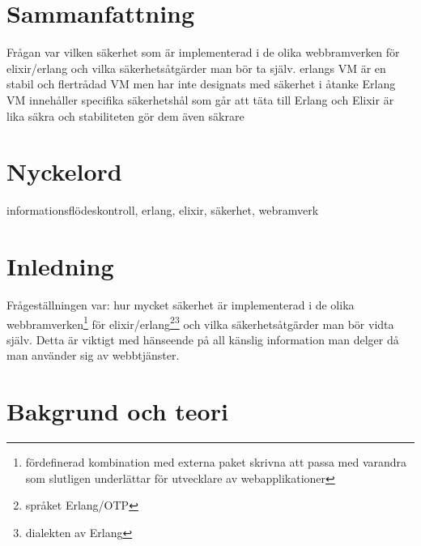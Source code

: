 \documentclass[12pt]{article}
\begin{document}
\maketitle

	 	 	 	 	
	
\section*{Sammanfattning}
Frågan var vilken säkerhet som är implementerad i de olika webbramverken för elixir/erlang och vilka säkerhetsåtgärder man bör ta själv.	
erlangs VM är en stabil och flertrådad VM men har inte designats med säkerhet i åtanke 
Erlang VM innehåller specifika säkerhetshål som går att täta till
Erlang och Elixir är lika säkra och stabiliteten gör dem även säkrare
	
\section*{Nyckelord}
informationsflödeskontroll, erlang, elixir, säkerhet, webramverk
	\section{Inledning}

Frågeställningen var: hur mycket säkerhet är implementerad i de olika webbramverken\footnote{fördefinerad kombination med externa paket skrivna att passa med varandra som slutligen underlättar för utvecklare av webapplikationer} för elixir/erlang\footnote{språket Erlang/OTP\cite{erlang}}\footnote{dialekten av Erlang\cite{elixir}} och vilka säkerhetsåtgärder man bör vidta själv. 
Detta är viktigt med hänseende på all känslig information man delger då man använder sig av webbtjänster.\\



 \section{Bakgrund och teori}
\end{document}
